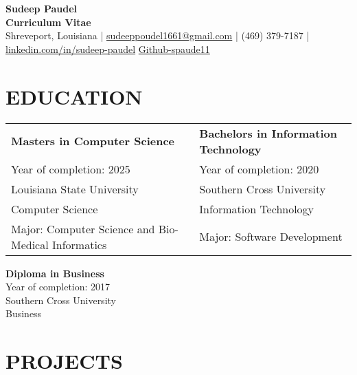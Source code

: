 \documentclass[a4paper,9pt]{article}
\begin{document}
\pagestyle{empty}

\begin{center}
\textbf{\Large Sudeep Paudel}\\[3pt] %
\textbf{Curriculum Vitae}\\[1pt] %
Shreveport, Louisiana | \href{mailto:sudeeppoudel1661@gmail.com}{sudeeppoudel1661@gmail.com} |
(469) 379-7187 | \href{https://www.linkedin.com/in/sudeep-paudel-4853ab28b/}{linkedin.com/in/sudeep-paudel} \href{https://github.com/spaude11}{Github-spaude11}
\end{center}


\section*{EDUCATION}

\noindent
\begin{tabular}{@{}p{} p{}@{}}
\textbf{Masters in Computer Science} & \textbf{Bachelors in Information Technology} \\
Year of completion: 2025 & Year of completion: 2020 \\
Louisiana State University & Southern Cross University \\
Computer Science & Information Technology \\
Major: Computer Science and Bio-Medical Informatics & Major: Software Development \\
\end{tabular}

\noindent
\textbf{Diploma in Business} \\
Year of completion: 2017 \\
Southern Cross University \\
Business

\section*{PROJECTS}
\end{document}
